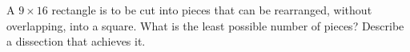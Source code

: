 A $9\times16$ rectangle is to be cut into pieces that can be rearranged, without overlapping, into a square. What is the least possible number of pieces? Describe a dissection that achieves it.
